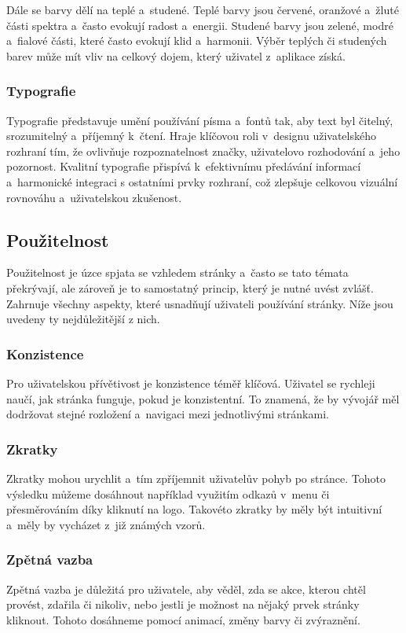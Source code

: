 Dále se barvy dělí na teplé a~studené. Teplé barvy jsou červené, oranžové a~žluté části spektra a~často evokují radost a~energii. Studené barvy jsou zelené, modré a~fialové části, které často evokují klid a~harmonii. Výběr teplých či studených barev může mít vliv na celkový dojem, který uživatel z~aplikace získá. \cite{color_theory_design} 

\subsubsection{Typografie}
Typografie představuje umění používání písma a~fontů tak, aby text byl čitelný, srozumitelný a~příjemný k~čtení. Hraje klíčovou roli v~designu uživatelského rozhraní tím, že ovlivňuje rozpoznatelnost značky, uživatelovo rozhodování a~jeho pozornost. Kvalitní typografie přispívá k~efektivnímu předávání informací a~harmonické integraci s ostatními prvky rozhraní, což zlepšuje celkovou vizuální rovnováhu a~uživatelskou zkušenost. \cite{typography}

\subsection{Použitelnost}
Použitelnost je úzce spjata se vzhledem stránky a~často se tato témata překrývají, ale zároveň je to samostatný princip, který je nutné uvést zvlášť. Zahrnuje všechny aspekty, které usnadňují uživateli používání stránky. Níže jsou uvedeny ty nejdůležitější z nich. \cite{principles_of_ui_design}

\subsubsection*{Konzistence}
Pro uživatelskou přívětivost je konzistence téměř klíčová. Uživatel se rychleji naučí, jak stránka funguje, pokud je konzistentní. To znamená, že by vývojář měl dodržovat stejné rozložení a~navigaci mezi jednotlivými stránkami.

\subsubsection*{Zkratky}
Zkratky mohou urychlit a~tím zpříjemnit uživatelův pohyb po stránce. Tohoto výsledku můžeme dosáhnout například využitím odkazů v~menu či přesměrováním díky kliknutí na logo. Takovéto zkratky by měly být intuitivní a~měly by vycházet z~již známých vzorů.

\subsubsection*{Zpětná vazba}
Zpětná vazba je důležitá pro uživatele, aby věděl, zda se akce, kterou chtěl provést, zdařila či nikoliv, nebo jestli je možnost na nějaký prvek stránky kliknout. Tohoto dosáhneme pomocí animací, změny barvy či zvýraznění.

